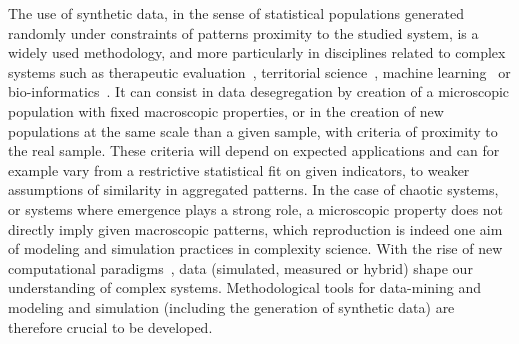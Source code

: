 The use of synthetic data, in the sense of statistical populations generated randomly under constraints of patterns proximity to the studied system, is a widely used methodology, and more particularly in disciplines related to complex systems such as therapeutic evaluation~\cite{abadie2010synthetic}, territorial science~\cite{moeckel2003creating,pritchard2009advances}, machine learning~\cite{bolon2013review} or bio-informatics~\cite{van2006syntren}. It can consist in data desegregation by creation of a microscopic population with fixed macroscopic properties, or in the creation of new populations at the same scale than a given sample, with criteria of proximity to the real sample. These criteria will depend on expected applications and can for example vary from a restrictive statistical fit on given indicators, to weaker assumptions of similarity in aggregated patterns. In the case of chaotic systems, or systems where emergence plays a strong role, a microscopic property does not directly imply given macroscopic patterns, which reproduction is indeed one aim of modeling and simulation practices in complexity science. With the rise of new computational paradigms~\cite{arthur2015complexity}, data (simulated, measured or hybrid) shape our understanding of complex systems. Methodological tools for data-mining and modeling and simulation (including the generation of synthetic data) are therefore crucial to be developed.

